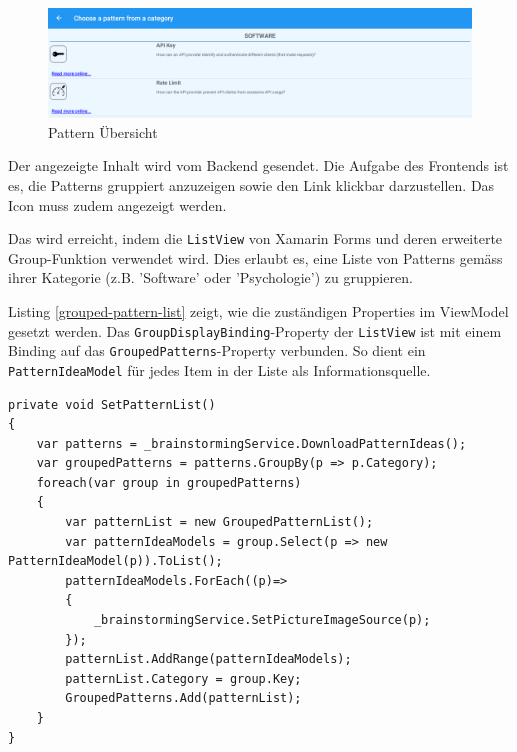 \begin{figure}[h]
	\centering
	\includegraphics[width=1\linewidth]{img/techn-bericht/pattern-overview}
	\caption{Pattern Übersicht}
	\label{fig:pattern-overview}
\end{figure}

Der angezeigte Inhalt wird vom Backend gesendet. Die Aufgabe des Frontends ist es, die Patterns gruppiert anzuzeigen sowie den Link klickbar darzustellen. Das Icon muss zudem angezeigt werden. 

Das wird erreicht, indem die \texttt{ListView} von Xamarin Forms und deren erweiterte Group-Funktion verwendet wird. Dies erlaubt es, eine Liste von Patterns gemäss ihrer Kategorie (z.B. 'Software' oder 'Psychologie') zu gruppieren. 

Listing \ref{grouped-pattern-list} zeigt, wie die zuständigen Properties im ViewModel gesetzt werden. Das \texttt{GroupDisplayBinding}-Property der \texttt{ListView} ist mit einem Binding auf das \texttt{Grouped\-Patterns}-Property verbunden. So dient ein \texttt{PatternIdeaModel} für jedes Item in der Liste als Informationsquelle.

\begin{lstlisting}[label={grouped-pattern-list}]
private void SetPatternList()
{
	var patterns = _brainstormingService.DownloadPatternIdeas();
	var groupedPatterns = patterns.GroupBy(p => p.Category);
	foreach(var group in groupedPatterns)
	{
		var patternList = new GroupedPatternList();
		var patternIdeaModels = group.Select(p => new PatternIdeaModel(p)).ToList();
		patternIdeaModels.ForEach((p)=>
		{
			_brainstormingService.SetPictureImageSource(p);
		});
		patternList.AddRange(patternIdeaModels);
		patternList.Category = group.Key;
		GroupedPatterns.Add(patternList);
	}
}
\end{lstlisting}

